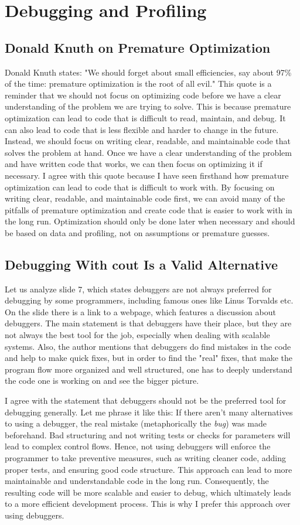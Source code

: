\documentclass[../../main.tex]{subfiles}
\begin{document}
\section{Debugging and Profiling}
\subsection{Donald Knuth on Premature Optimization}
Donald Knuth states: "We should forget about small efficiencies, say about 97\% of the time: premature optimization is the root of all evil."
This quote is a reminder that we should not focus on optimizing code before we have a clear understanding of the problem we are trying to solve. This is because premature optimization can lead to code that is difficult to read, maintain, and debug. It can also lead to code that is less flexible and harder to change in the future. Instead, we should focus on writing clear, readable, and maintainable code that solves the problem at hand. Once we have a clear understanding of the problem and have written code that works, we can then focus on optimizing it if necessary. I agree with this quote because I have seen firsthand how premature optimization can lead to code that is difficult to work with. By focusing on writing clear, readable, and maintainable code first, we can avoid many of the pitfalls of premature optimization and create code that is easier to work with in the long run. Optimization should only be done later when necessary and should be based on data and profiling, not on assumptions or premature guesses.

\bigskip
\subsection{Debugging With cout Is a Valid Alternative}
Let us analyze slide 7, which states debuggers are not always preferred for debugging by some programmers, including famous ones like Linus Torvalds etc. On the slide there is a link to a webpage, which features a discussion about debuggers. The main statement is that debuggers have their place, but they are not always the best tool for the job, especially when dealing with scalable systems. Also, the author mentions that debuggers do find mistakes in the code and help to make quick fixes, but in order to find the "real" fixes, that make the program flow more organized and well structured, one has to deeply understand the code one is working on and see the bigger picture.

I agree with the statement that debuggers should not be the preferred tool for debugging generally. Let me phrase it like this: If there aren't many alternatives to using a debugger, the real mistake (metaphorically the \emph{bug}) was made beforehand. Bad structuring and not writing tests or checks for parameters will lead to complex control flows. Hence, not using debuggers will enforce the programmer to take preventive measures, such as writing cleaner code, adding proper tests, and ensuring good code structure. This approach can lead to more maintainable and understandable code in the long run. Consequently, the resulting code will be more scalable and easier to debug, which ultimately leads to a more efficient development process. This is why I prefer this approach over using debuggers.
\end{document}
